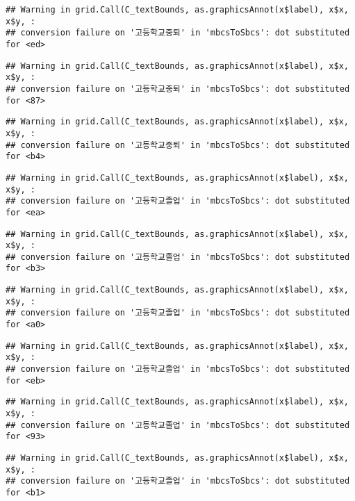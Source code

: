\documentclass[
]{article}
\begin{document}
\begin{verbatim}
## Warning in grid.Call(C_textBounds, as.graphicsAnnot(x$label), x$x, x$y, :
## conversion failure on '고등학교중퇴' in 'mbcsToSbcs': dot substituted for <ed>
\end{verbatim}

\begin{verbatim}
## Warning in grid.Call(C_textBounds, as.graphicsAnnot(x$label), x$x, x$y, :
## conversion failure on '고등학교중퇴' in 'mbcsToSbcs': dot substituted for <87>
\end{verbatim}

\begin{verbatim}
## Warning in grid.Call(C_textBounds, as.graphicsAnnot(x$label), x$x, x$y, :
## conversion failure on '고등학교중퇴' in 'mbcsToSbcs': dot substituted for <b4>
\end{verbatim}

\begin{verbatim}
## Warning in grid.Call(C_textBounds, as.graphicsAnnot(x$label), x$x, x$y, :
## conversion failure on '고등학교졸업' in 'mbcsToSbcs': dot substituted for <ea>
\end{verbatim}

\begin{verbatim}
## Warning in grid.Call(C_textBounds, as.graphicsAnnot(x$label), x$x, x$y, :
## conversion failure on '고등학교졸업' in 'mbcsToSbcs': dot substituted for <b3>
\end{verbatim}

\begin{verbatim}
## Warning in grid.Call(C_textBounds, as.graphicsAnnot(x$label), x$x, x$y, :
## conversion failure on '고등학교졸업' in 'mbcsToSbcs': dot substituted for <a0>
\end{verbatim}

\begin{verbatim}
## Warning in grid.Call(C_textBounds, as.graphicsAnnot(x$label), x$x, x$y, :
## conversion failure on '고등학교졸업' in 'mbcsToSbcs': dot substituted for <eb>
\end{verbatim}

\begin{verbatim}
## Warning in grid.Call(C_textBounds, as.graphicsAnnot(x$label), x$x, x$y, :
## conversion failure on '고등학교졸업' in 'mbcsToSbcs': dot substituted for <93>
\end{verbatim}

\begin{verbatim}
## Warning in grid.Call(C_textBounds, as.graphicsAnnot(x$label), x$x, x$y, :
## conversion failure on '고등학교졸업' in 'mbcsToSbcs': dot substituted for <b1>
\end{verbatim}
\end{document}
